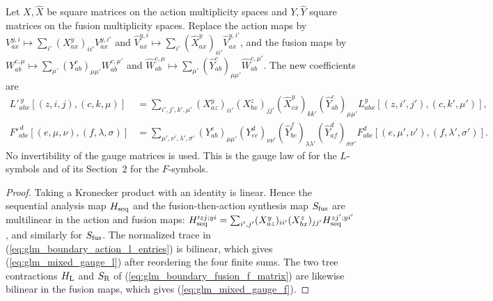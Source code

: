 \begin{lemma}
    \leanok
    \label{lem:glm_mixed_gauge_coefficients}
    Let $X,\widehat X$ be square matrices on the action multiplicity spaces
    and $Y,\widehat Y$ square matrices on the fusion multiplicity spaces.
    Replace the action maps by
    $V_{ax}^{y,i}\mapsto\sum_{i'}(X_{ax}^{y})_{ii'}V_{ax}^{y,i'}$ and
    $\widehat V_{ax}^{y,i}\mapsto\sum_{i'}(\widehat X_{ax}^{y})_{ii'}
        \widehat V_{ax}^{y,i'}$, and the fusion maps by
    $W_{ab}^{c,\mu}\mapsto\sum_{\mu'}(Y_{ab}^{c})_{\mu\mu'}W_{ab}^{c,\mu'}$
    and
    $\widehat W_{ab}^{c,\mu}\mapsto\sum_{\mu'}(\widehat Y_{ab}^{c})_{\mu\mu'}
        \widehat W_{ab}^{c,\mu'}$. The new coefficients are
    \begin{align}
        L'^{\,y}_{abx}[(z,i,j),(c,k,\mu)]
         & =\sum_{i',j',k',\mu'}(X_{az}^{y})_{ii'}(X_{bx}^{z})_{jj'}
        (\widehat X_{cx}^{y})_{kk'}(\widehat Y_{ab}^{c})_{\mu\mu'}
        L_{abx}^{y}[(z,i',j'),(c,k',\mu')],
        \label{eq:glm_mixed_gauge_l}                                 \\
        F'^{\,d}_{abc}[(e,\mu,\nu),(f,\lambda,\sigma)]
         & =\sum_{\mu',\nu',\lambda',\sigma'}(Y_{ab}^{e})_{\mu\mu'}
        (Y_{ec}^{d})_{\nu\nu'}(\widehat Y_{bc}^{f})_{\lambda\lambda'}
        (\widehat Y_{af}^{d})_{\sigma\sigma'}
        F_{abc}^{d}[(e,\mu',\nu'),(f,\lambda',\sigma')].
        \label{eq:glm_mixed_gauge_f}
    \end{align}
    No invertibility of the gauge matrices is used. This is the gauge law of
    \cite[Section~3]{GarreRubio2023MPOSym} for the $L$-symbols and of its
    Section~2 for the $F$-symbols.
\end{lemma}
\begin{proof}
    \leanok
    Taking a Kronecker product with an identity is linear. Hence the
    sequential analysis map $H_{\rm seq}$ and the fusion-then-action
    synthesis map $S_{\rm fus}$ are multilinear in the action and fusion maps:
    $H'^{zj;yi}_{\rm seq}=\sum_{i',j'}(X_{az}^y)_{ii'}(X_{bx}^z)_{jj'}
        H^{zj';yi'}_{\rm seq}$, and similarly for $S_{\rm fus}$. The normalized
    trace in (\ref{eq:glm_boundary_action_l_entries}) is bilinear, which gives
    (\ref{eq:glm_mixed_gauge_l}) after reordering the four finite sums. The
    two tree contractions $H_{\rm L}$ and $S_{\rm R}$ of
    (\ref{eq:glm_boundary_fusion_f_matrix}) are likewise bilinear in the
    fusion maps, which gives (\ref{eq:glm_mixed_gauge_f}).
\end{proof}

